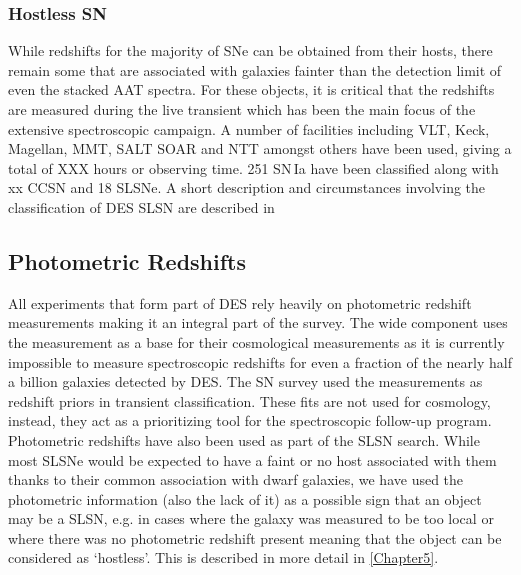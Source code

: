 \subsubsection{Hostless SN}
While redshifts for the majority of SNe can be obtained from their hosts, there remain some that are associated with galaxies fainter than the detection limit of even the stacked AAT spectra. For these objects, it is critical that the redshifts are measured during the live transient which has been the main focus of the extensive spectroscopic campaign. A number of facilities including VLT, Keck, Magellan, MMT, SALT SOAR and NTT amongst others have been used, giving a total of XXX hours or observing time. 251 SN\,Ia have been classified along with xx CCSN and 18 SLSNe. A short description and circumstances involving the classification of DES SLSN are described in 

\subsection{Photometric Redshifts}
All experiments that form part of DES rely heavily on photometric redshift measurements making it an integral part of the survey. The wide component uses the measurement as a base for their cosmological measurements as it is currently impossible to measure spectroscopic redshifts for even a fraction of the nearly half a billion galaxies detected by DES. The SN survey used the measurements as redshift priors in transient classification. These fits are not used for cosmology, instead, they act as a prioritizing tool for the spectroscopic follow-up program. Photometric redshifts have also been used as part of the SLSN search. While most SLSNe would be expected to have a faint or no host associated with them thanks to their common association with dwarf galaxies, we have used the photometric information (also the lack of it) as a possible sign that an object may be a SLSN, e.g. in cases where the galaxy was measured to be too local or where there was no photometric redshift present meaning that the object can be considered as `hostless'. This is described in more detail in \cref{Chapter5}.

